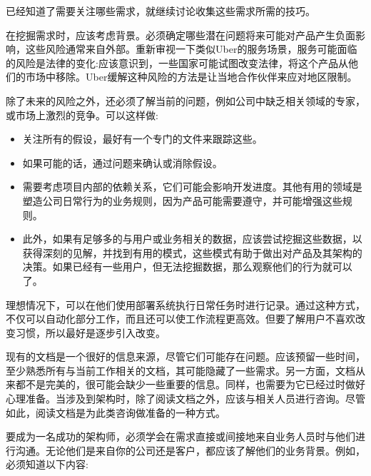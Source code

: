 
已经知道了需要关注哪些需求，就继续讨论收集这些需求所需的技巧。


在挖掘需求时，应该考虑背景。必须确定哪些潜在问题将来可能对产品产生负面影响，这些风险通常来自外部。重新审视一下类似Uber的服务场景，服务可能面临的风险是法律的变化:应该意识到，一些国家可能试图改变法律，将这个产品从他们的市场中移除。Uber缓解这种风险的方法是让当地合作伙伴来应对地区限制。

除了未来的风险之外，还必须了解当前的问题，例如公司中缺乏相关领域的专家，或市场上激烈的竞争。可以这样做:

\begin{itemize}
\item 
关注所有的假设，最好有一个专门的文件来跟踪这些。

\item 
如果可能的话，通过问题来确认或消除假设。

\item 
需要考虑项目内部的依赖关系，它们可能会影响开发进度。其他有用的领域是塑造公司日常行为的业务规则，因为产品可能需要遵守，并可能增强这些规则。

\item 
此外，如果有足够多的与用户或业务相关的数据，应该尝试挖掘这些数据，以获得深刻的见解，并找到有用的模式，这些模式有助于做出对产品及其架构的决策。如果已经有一些用户，但无法挖掘数据，那么观察他们的行为就可以了。
\end{itemize}

理想情况下，可以在他们使用部署系统执行日常任务时进行记录。通过这种方式，不仅可以自动化部分工作，而且还可以使工作流程更高效。但要了解用户不喜欢改变习惯，所以最好是逐步引入改变。


现有的文档是一个很好的信息来源，尽管它们可能存在问题。应该预留一些时间，至少熟悉所有与当前工作相关的文档，其可能隐藏了一些需求。另一方面，文档从来都不是完美的，很可能会缺少一些重要的信息。同样，也需要为它已经过时做好心理准备。当涉及到架构时，除了阅读文档之外，应该与相关人员进行咨询。尽管如此，阅读文档是为此类咨询做准备的一种方式。


要成为一名成功的架构师，必须学会在需求直接或间接地来自业务人员时与他们进行沟通。无论他们是来自你的公司还是客户，都应该了解他们的业务背景。例如，必须知道以下内容:

